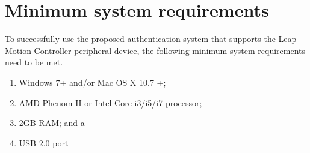 
\chapter{Minimum system requirements}
\label{AppendixC}

To successfully use the proposed authentication system that supports the Leap Motion Controller peripheral device, the following minimum system requirements need to be met. 

\begin{enumerate}[label=\roman*.]
    \item Windows 7+ and/or Mac OS X 10.7 +;
    \item AMD Phenom II or Intel Core i3/i5/i7 processor;
    \item 2GB RAM; and a
    \item USB 2.0 port
\end{enumerate}
    
